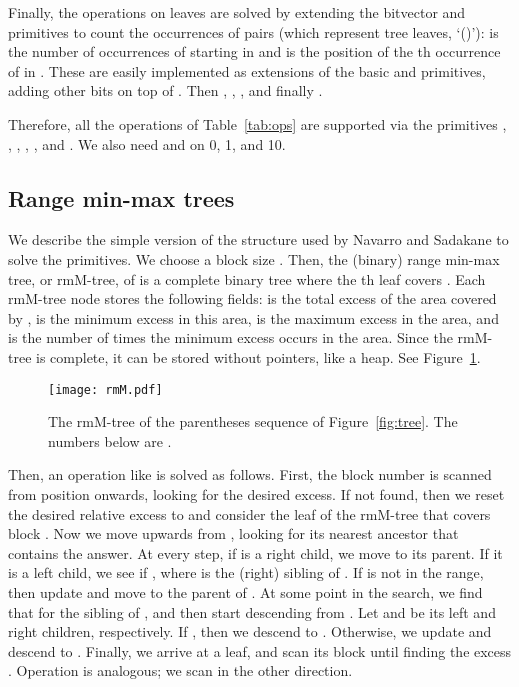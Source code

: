 \documentclass[11pt]{article}
\newcommand{\0}{\mathit{0}}
\newcommand{\1}{\mathit{1}}
\begin{document}
Finally, the operations on leaves are solved by extending the bitvector 
 and  primitives to count the occurrences of pairs  (which 
represent tree leaves, `()'):  is the number of occurrences of 
 starting in  and  is the position of the th
occurrence of  in . These are easily implemented as extensions of the 
basic  and  primitives, adding other  bits on top of
. Then 
, , 
,
 and finally
.

Therefore, all the operations of Table~\ref{tab:ops} are supported via the
primitives , , , , , and
. We also need  and  on 0, 1, and 10.

\subsection{Range min-max trees}

We describe the simple version of the structure used by Navarro and Sadakane 
\cite{NS14} to solve the primitives. 
We choose a block size . Then, the (binary) range 
min-max tree, or rmM-tree, of  is a complete binary tree where the 
th leaf covers . Each rmM-tree node  stores the following
fields:  is the total excess of the area covered by ,  is the
minimum excess in this area,  is the maximum excess in the area, and
 is the number of times the minimum excess occurs in the area. Since the
rmM-tree is complete, it can be stored without pointers, like a heap.
See Figure~\ref{fig:rmM}.

\begin{figure}[t]
\centerline{\texttt{[image: rmM.pdf]}}
\caption{The rmM-tree of the parentheses sequence of Figure~\ref{fig:tree}.
The numbers below are .}
\label{fig:rmM}
\end{figure}

Then, an operation like  is solved as follows. First, the block
number  is scanned from position  onwards, looking for 
the desired excess. If not found, then we reset the desired relative excess
to  and consider the leaf  of 
the rmM-tree that covers block . Now we move upwards from , looking for 
its nearest ancestor that contains the answer. At every step, if  is a
right child, we move to its parent. If it is a left child, we see if
, where  is the (right) sibling of . If  is not 
in the range, then update  and move to the parent of .
At some point in the search, we find that  for the
sibling  of , and then start descending from . Let  and  
be its left and right children, respectively. 
If , then we descend to . Otherwise,
we update  and descend to . Finally, we arrive at
a leaf, and scan its block until finding the excess .
Operation  is analogous; we scan in the other direction.
\end{document}
